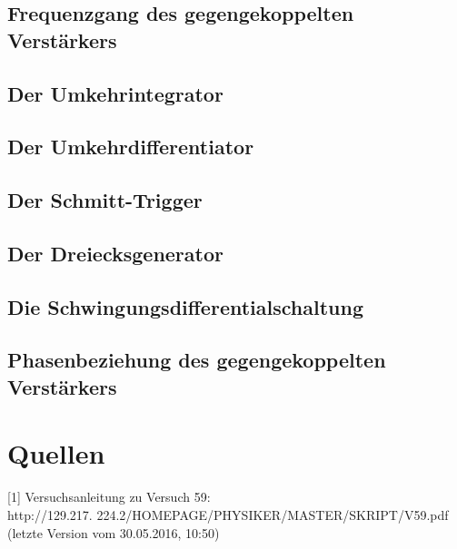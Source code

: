 \documentclass[]{scrartcl}
\begin{document}
\subsection{Frequenzgang des gegengekoppelten Verstärkers}

\subsection{Der Umkehrintegrator}

\subsection{Der Umkehrdifferentiator}

\subsection{Der Schmitt-Trigger}

\subsection{Der Dreiecksgenerator}

\subsection{Die Schwingungsdifferentialschaltung}

\subsection{Phasenbeziehung des gegengekoppelten Verstärkers}

\section{Quellen}
{[1]} Versuchsanleitung zu Versuch 59: \\
http://129.217.
224.2/HOMEPAGE/PHYSIKER/MASTER/SKRIPT/V59.pdf (letzte Version vom 30.05.2016, 10:50)\\
\end{document}
